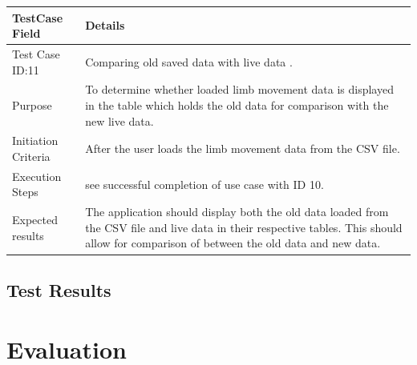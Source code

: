 \documentclass[a4paper, 12pt]{article}
\begin{document}
\begin{table}[!htb]
 \begin{tabular}{|p{4cm}|p{10cm}|}
 \hline
  TestCase Field & Details \\
  \hline
   Test Case ID:11 & Comparing old saved data with live data . \\
  \hline 
   Purpose & To determine whether loaded limb movement data is displayed in the table which holds the old data for comparison with the new live data. \\
  \hline
   Initiation Criteria & After the user loads the limb movement data from the CSV file. \\
  \hline
   Execution Steps & see successful completion of use case with ID 10.  \\
  \hline
   Expected results & The application should display both the old data loaded from the CSV file and live data in their respective tables. This should allow for comparison of between the old data and new data. \\
  \hline
 \end{tabular}
\end{table}

\subsection{Test Results}
\clearpage
\newpage

\section{Evaluation}



\newpage



 
\end{document}
